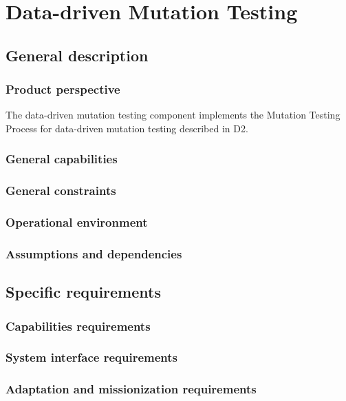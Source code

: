 


\chapter{Data-driven Mutation Testing}

\section{General description}




\subsection{Product perspective}
\RQ{} The data-driven mutation testing component implements the Mutation Testing Process for data-driven mutation testing described in D2.
\clearpage
\subsection{General capabilities}

\clearpage
\subsection{General constraints}
\subsection{Operational environment}
\subsection{Assumptions and dependencies}
\section{Specific requirements}
\subsection{Capabilities requirements}
\subsection{System interface requirements}
\subsection{Adaptation and missionization requirements }
